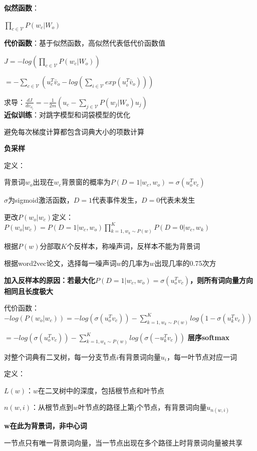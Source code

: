 \documentclass[UTF8]{ctexart}
\begin{document}
  \textbf{似然函数}：

  \quad $\prod_{c \in \mathcal{V} } P(w_c | W_o)$

  \textbf{代价函数}：基于似然函数，高似然代表低代价函数值

  \quad $J = -log(\prod_{c \in \mathcal{V} } P(w_c | W_o))$

  \quad \quad $= -\sum_{c \in \mathcal{V} } (u_c^T\bar{v}_o - log(\sum_{i\in \mathcal{V} } exp(u_i^T\bar{v}_o )))$

  \quad 求导：$\frac{d J}{d v_{o_i}} = -\frac{1}{2m}(u_c - \sum_{j \in \mathcal{V} }P(w_j | W_o)u_j)$\\
\textbf{近似训练}：对跳字模型和词袋模型的优化

  避免每次梯度计算都包含词典大小的项数计算

  \textbf{负采样}

  \quad 定义：

  \quad \quad 背景词$w_o$出现在$w_c$背景窗的概率为$P(D = 1|w_c, w_o) = \sigma(u_o^Tv_c)$

  \quad \quad \quad $\sigma$为sigmoid激活函数，$D = 1$代表事件发生，$D = 0$代表未发生

  \quad 更改$P(w_o | w_c)$定义：$P(w_o | w_c) = P(D = 1| w_c, w_o)\prod_{k=1, w_k \sim P(w)}^{K}P(D = 0 | w_c, w_k)$

  \quad \quad 根据$P(w)$分部取$K$个反样本，称噪声词，反样本不能为背景词

  \quad \quad \quad 根据word2vec论文，选择每一噪声词$w$的几率为$w$出现几率的0.75次方

  \quad \quad \textbf{加入反样本的原因：若最大化$P(D = 1|w_c, w_o) = \sigma(u_o^Tv_c)$，则所有词向量方向相同且长度极大}

  \quad 代价函数：$-log(P(w_o | w_c)) = -log(\sigma(u_o^Tv_c)) - \sum_{k=1, w_k \sim P(w)}^{K}log(1-\sigma(u_k^Tv_c))$

  \quad \quad $ = -log(\sigma(u_o^Tv_c)) - \sum_{k=1, w_k \sim P(w)}^{K}log(\sigma(-u_k^Tv_c))$
  \textbf{层序softmax}
  
  \quad 对整个词典有二叉树，每一分支节点$i$有背景词向量$u_i$，每一叶节点对应一词

  \quad 定义：

  \quad \quad $L(w)$：$w$在二叉树中的深度，包括根节点和叶节点

  \quad \quad $n(w, i)$：从根节点到$w$叶节点的路径上第j个节点，有背景词向量$u_{n(w, i)}$

  \quad \quad \quad \textbf{w在此为背景词，非中心词}

  \quad \quad \quad 一节点只有唯一背景词向量，当一节点出现在多个路径上时背景词向量被共享
\end{document}
